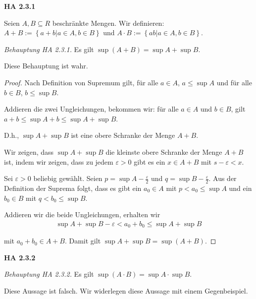 \documentclass[12pt]{extarticle}
\begin{document}
  \textbf{HA 2.3.1}

  Seien \(A, B \subseteq R\) beschränkte Mengen.  Wir
  definieren: \(A+B:= \left\{ a+b | a \in A, b \in B \right\}\) und $A
  \cdot B:= \left\{ ab| a \in A, b \in B \right\}$.

\vspace{4mm}

  \textit{Behauptung HA 2.3.1.}  Es gilt \(\sup (A+B)=\sup A + \sup B\).

  Diese Behauptung ist wahr.

  \begin{proof}
Nach Definition von Supremum gilt, für alle \(a \in A\), \(a \leq \sup A\)
und für alle \(b \in B\), \(b \leq \sup B\).

Addieren die zwei Ungleichungen, bekommen wir:  für alle \(a \in A\) und
\(b \in B\), gilt \(a+b \leq \sup A + b \leq \sup A + \sup B\).

D.h., \(\sup A + \sup B\) ist eine obere Schranke der Menge \(A + B\).

\vspace{4mm}

Wir zeigen, dass \(\sup A + \sup B\) die kleinste obere Schranke der
Menge \(A + B\) ist, indem wir zeigen, dass zu jedem \(\varepsilon > 0\)
gibt es ein \(x \in A+B\) mit \(s- \varepsilon <x\).

\vspace{4mm}

Sei \(\varepsilon > 0\) beliebig gewählt.  Seien
\(p = \sup A - \frac{\varepsilon}{2}\) und
\(q = \sup B - \frac{\varepsilon}{2}\).  Aus der Definition der Suprema
folgt, dass es gibt ein \(a_0 \in A\) mit \(p < a_0 \leq \sup A\) und ein
\(b_0 \in B\) mit \(q < b_0 \leq \sup B\).

Addieren wir die beide Ungleichungen, erhalten wir
\begin{align*}
\sup A + \sup B -\varepsilon < a_0 + b_0 \leq \sup A + \sup B
\end{align*}

mit \(a_0 + b_0 \in A + B\).  Damit gilt  \(\sup A + \sup B = \sup (A+B)\).
  \end{proof}

\vspace{4mm}

  \textbf{HA 2.3.2}

  \textit{Behauptung HA 2.3.2.}  Es gilt \(\sup (A \cdot B)=\sup A \cdot \sup B\).


  Diese Aussage ist falsch.  Wir widerlegen diese Aussage mit einem
  Gegenbeispiel.
\end{document}
